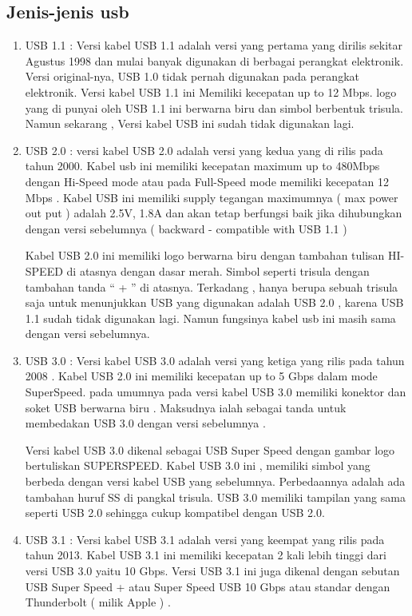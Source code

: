 \subsection {Jenis-jenis usb}
\begin {enumerate}
\item
	USB 1.1 : Versi kabel USB 1.1 adalah versi yang pertama yang dirilis sekitar Agustus 1998 dan mulai banyak digunakan di berbagai perangkat elektronik. Versi original-nya, USB 1.0 tidak pernah digunakan pada perangkat elektronik. Versi kabel USB 1.1 ini Memiliki kecepatan up to 12 Mbps. logo yang di punyai oleh USB 1.1 ini berwarna biru dan simbol berbentuk trisula. Namun sekarang , Versi kabel USB ini sudah tidak digunakan lagi.
\item
	USB 2.0 : versi kabel USB 2.0 adalah versi yang kedua yang di rilis pada tahun 2000. Kabel usb ini memiliki kecepatan maximum up to 480Mbps dengan Hi-Speed mode atau pada Full-Speed mode memiliki kecepatan 12 Mbps . Kabel USB ini memiliki supply tegangan maximumnya ( max power out put ) adalah 2.5V, 1.8A dan akan tetap berfungsi baik jika dihubungkan dengan versi sebelumnya ( backward - compatible with USB 1.1 )
	
	Kabel USB 2.0 ini memiliki logo berwarna biru dengan tambahan tulisan HI-SPEED di atasnya dengan dasar merah. Simbol seperti trisula dengan tambahan tanda “ + ” di atasnya. Terkadang , hanya berupa sebuah trisula saja untuk menunjukkan USB yang digunakan adalah USB 2.0 , karena USB 1.1 sudah tidak digunakan lagi. Namun fungsinya kabel usb ini masih sama dengan versi sebelumnya.
\item
	USB 3.0 : Versi kabel USB 3.0 adalah versi yang ketiga yang rilis pada tahun 2008 . Kabel USB 2.0 ini memiliki kecepatan up to 5 Gbps dalam mode SuperSpeed. pada umumnya pada versi kabel USB 3.0 memiliki konektor dan soket USB berwarna biru . Maksudnya ialah sebagai tanda untuk membedakan USB 3.0 dengan versi sebelumnya .
	
	Versi kabel USB 3.0 dikenal sebagai USB Super Speed dengan gambar logo bertuliskan SUPERSPEED. Kabel USB 3.0 ini , memiliki simbol yang berbeda dengan versi kabel USB yang sebelumnya. Perbedaannya adalah ada tambahan huruf SS di pangkal trisula. USB 3.0 memiliki tampilan yang sama seperti USB 2.0 sehingga cukup kompatibel dengan USB 2.0.
	
\item
	USB 3.1 : Versi kabel USB 3.1 adalah versi yang keempat yang rilis pada tahun 2013. Kabel USB 3.1 ini memiliki kecepatan 2 kali lebih tinggi dari versi USB 3.0 yaitu 10 Gbps. Versi USB 3.1 ini juga dikenal dengan sebutan USB Super Speed + atau Super Speed USB 10 Gbps atau standar dengan Thunderbolt ( milik Apple ) .
	

\end{enumerate}
